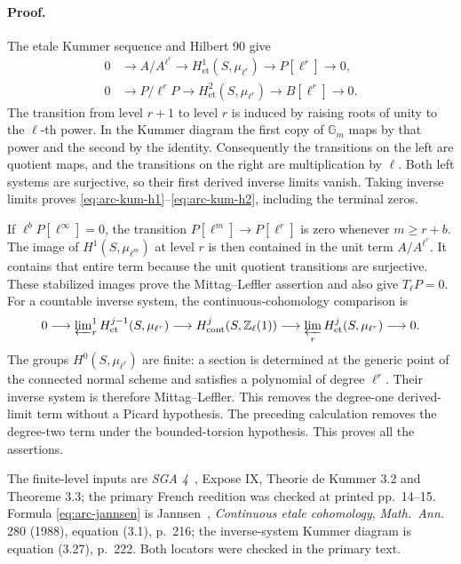 \documentclass[11pt,a4paper]{article}
\theoremstyle{definition}
\begin{document}
\paragraph{Proof.}
The etale Kummer sequence and Hilbert 90 give
\begin{align*}
 0&\longrightarrow A/A^{\ell^r}
   \longrightarrow H^1_{\mathrm{et}}(S,\mu_{\ell^r})
   \longrightarrow P[\ell^r]\longrightarrow 0,\\
 0&\longrightarrow P/\ell^rP
   \longrightarrow H^2_{\mathrm{et}}(S,\mu_{\ell^r})
   \longrightarrow B[\ell^r]\longrightarrow 0.
\end{align*}
The transition from level \(r+1\) to level \(r\) is induced by raising
roots of unity to the \(\ell\)-th power.  In the Kummer diagram the first
copy of \(\mathbb G_m\) maps by that power and the second by the identity.
Consequently the transitions on the left are quotient maps, and the
transitions on the right are multiplication by \(\ell\).  Both left
systems are surjective, so their first derived inverse limits vanish.
Taking inverse limits proves
\eqref{eq:arc-kum-h1}--\eqref{eq:arc-kum-h2}, including the terminal zeros.

If \(\ell^bP[\ell^\infty]=0\), the transition
\(P[\ell^m]\longrightarrow P[\ell^r]\) is zero whenever \(m\geq r+b\).
The image of \(H^1(S,\mu_{\ell^m})\) at level \(r\) is then contained in
the unit term \(A/A^{\ell^r}\).  It contains that entire term because
the unit quotient transitions are surjective.  These stabilized images
prove the Mittag--Leffler assertion and also give \(T_\ell P=0\).
For a countable inverse system, the continuous-cohomology comparison is
\begin{equation}\label{eq:arc-jannsen}
 0\longrightarrow \varprojlim\nolimits^1_r
 H^{j-1}_{\mathrm{et}}(S,\mu_{\ell^r})
 \longrightarrow H^j_{\mathrm{cont}}(S,\mathbb Z_\ell(1))
 \longrightarrow \varprojlim_r
 H^j_{\mathrm{et}}(S,\mu_{\ell^r})\longrightarrow 0.
\end{equation}
The groups \(H^0(S,\mu_{\ell^r})\) are finite: a section is determined
at the generic point of the connected normal scheme and satisfies a
polynomial of degree \(\ell^r\).  Their inverse system is therefore
Mittag--Leffler.  This removes the degree-one derived-limit term without
a Picard hypothesis.  The preceding calculation removes the
degree-two term under the bounded-torsion hypothesis.  This proves all
the assertions.

The finite-level inputs are \emph{SGA 4}~\cite{SGA4}, Expose IX,
Theorie de Kummer 3.2 and Theoreme 3.3; the primary French reedition was
checked at printed pp.~14--15.  Formula \eqref{eq:arc-jannsen} is Jannsen~\cite{Jannsen1988},
\emph{Continuous etale cohomology}, \emph{Math.\ Ann.} 280 (1988),
equation (3.1), p.~216; the inverse-system Kummer diagram is
equation (3.27), p.~222.  Both locators were checked in the primary text.
\end{document}
